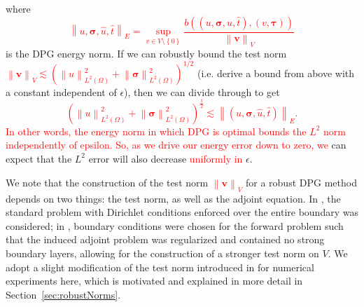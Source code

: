 \documentclass[letterpaper]{article}
\def\bftau{\boldsymbol\tau}
\def\bfsigma{\boldsymbol\sigma}
\newcommand{\secref}[1]{\ref{sec:#1}}
\newcommand{\norm}[1]{\left\| #1 \right\|}
\newcommand{\LRp}[1]{\left( #1 \right)}
\newcommand{\LRc}[1]{\left\{ #1 \right\}}
\newcommand{\uh}{\widehat{u}}
\renewcommand{\L}{L^2\LRp{\Omega}}
\newcommand{\bfv}{\boldsymbol v}
\newcommand{\red}[1]{\textcolor{red}{#1}}
\begin{document}
where
\red{
\[
\norm{u,\bfsigma,\uh,\hat t}_E = \sup_{v\in
V\setminus\LRc{0}}\frac{b\LRp{\LRp{u,\bfsigma,\uh,\hat t},\LRp{v,\bftau}}}{\norm{\bfv}_V}
\]
}
is the DPG energy norm.  If we can robustly bound the test norm \red{$\norm{\bfv}_V
\lesssim \LRp{\norm{u}_{\L}^2+\norm{\bfsigma}^2_{\L}}^{1/2}$} (i.e. derive a
bound from above with a constant independent of $\epsilon$), then we can
divide through to get
\red{
\begin{equation}
\LRp{\norm{u}_{\L}^2 + \norm{\bfsigma}_{\L}^2}^{\frac{1}{2}} \lesssim
\norm{(u,\bfsigma,\uh,\hat t)}_E.
\label{eq:robustBound}
\end{equation}
}
\red{
In other words, the energy norm in which DPG 
is optimal bounds the $L^2$ norm independently of epsilon.  So, as
we drive our energy error down to zero, we
}
can expect that the $L^2$ error will also decrease \red{uniformly in} $\epsilon$.

We note that the construction of the test norm \red{$\norm{\bfv}_V$} for a robust DPG
method depends on two things: the test norm, as well as the adjoint equation.
In \cite{DemkowiczHeuer}, the standard problem with Dirichlet conditions
enforced over the entire boundary was considered; in
\cite{ChanHeuerThanhDemkowicz2012}, boundary conditions were chosen for the
forward problem such that the induced adjoint problem was regularized and
contained no strong boundary layers, allowing for the construction of a
stronger test norm on $V$.  We adopt a slight modification of the test norm
introduced in \cite{ChanHeuerThanhDemkowicz2012} for numerical experiments
here, which is motivated and explained in more detail in
Section~\secref{robustNorms}.
\end{document}
